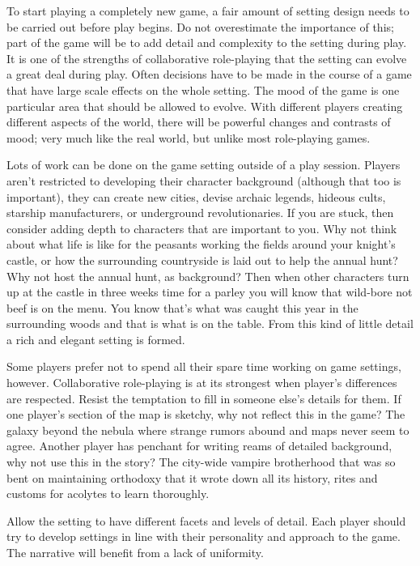 \documentclass[twoside]{book}
\begin{document}
To start playing a completely new game, a fair amount of setting
design needs to be carried out before play begins. Do not overestimate
the importance of this; part of the game will be to add detail and
complexity to the setting during play. It is one of the strengths of
collaborative role-playing that the setting can evolve a great deal
during play. Often decisions have to be made in the course of a game
that have large scale effects on the whole setting. The mood of the
game is one particular area that should be allowed to evolve. With
different players creating different aspects of the world, there will
be powerful changes and contrasts of mood; very much like the real
world, but unlike most role-playing games.

Lots of work can be done on the game setting outside of a play
session. Players aren't restricted to developing their character
background (although that too is important), they can create new
cities, devise archaic legends, hideous cults, starship manufacturers,
or underground revolutionaries. If you are stuck, then consider adding
depth to characters that are important to you. Why not think about
what life is like for the peasants working the fields around your
knight's castle, or how the surrounding countryside is laid out to
help the annual hunt? Why not host the annual hunt, as background?
Then when other characters turn up at the castle in three weeks time
for a parley you will know that wild-bore not beef is on the menu. You
know that's what was caught this year in the surrounding woods and
that is what is on the table. From this kind of little detail a rich
and elegant setting is formed.

Some players prefer not to spend all their spare time working on game
settings, however. Collaborative role-playing is at its strongest when
player's differences are respected. Resist the temptation to fill in
someone else's details for them. If one player's section of the map is
sketchy, why not reflect this in the game? The galaxy beyond the
nebula where strange rumors abound and maps never seem to
agree. Another player has penchant for writing reams of detailed
background, why not use this in the story? The city-wide vampire
brotherhood that was so bent on maintaining orthodoxy that it wrote
down all its history, rites and customs for acolytes to learn
thoroughly.

Allow the setting to have different facets and levels of detail. Each
player should try to develop settings in line with their personality
and approach to the game. The narrative will benefit from a lack of
uniformity.
\end{document}
